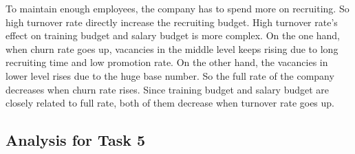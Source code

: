 \documentclass[12pt,a4paper,titlepage]{article}
\begin{document}
To maintain enough employees, the company has to spend more on
recruiting. So high turnover rate directly increase the recruiting
budget. High turnover rate's effect on training budget and salary
budget is more complex. On the one hand, when churn rate goes up,
vacancies in the middle level keeps rising due to long recruiting time
and low promotion rate. On the other hand, the vacancies in lower level
rises due to the huge base number. So the full rate of
the company decreases when churn rate rises. Since training budget and
salary budget are closely related to full rate, both of them decrease
when turnover rate goes up.

\subsection{Analysis for Task 5}
\label{sec:analysis-for-task-5}
\end{document}
